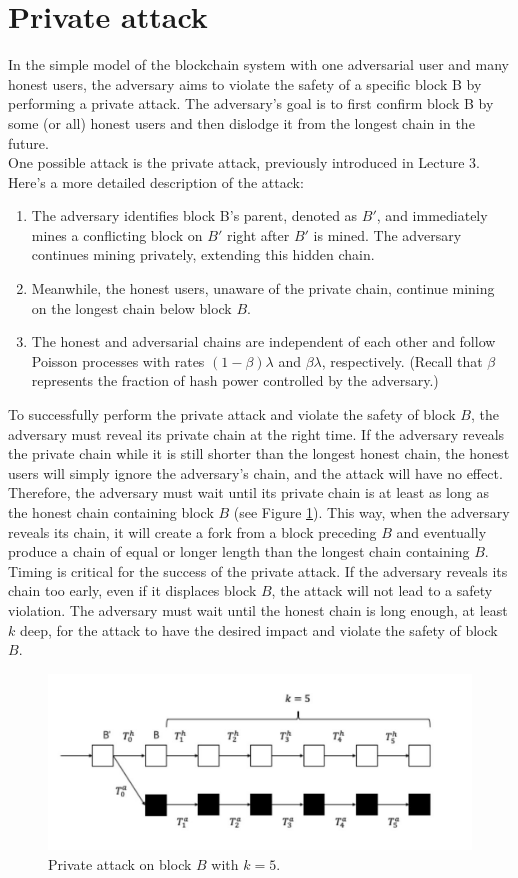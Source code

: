 \section{Private attack}
In the simple model of the blockchain system with one adversarial user and many honest users, the adversary aims to violate the safety of a specific block B by performing a private attack. The adversary's goal is to first confirm block B by some (or all) honest users and then dislodge it from the longest chain in the future.\\
One possible attack is the private attack, previously introduced in Lecture 3. Here's a more detailed description of the attack:
\begin{enumerate}
    \item The adversary identifies block B's parent, denoted as $B′$, and immediately mines a conflicting block on $B′$ right after $B′$ is mined. The adversary continues mining privately, extending this hidden chain. 
    \item Meanwhile, the honest users, unaware of the private chain, continue mining on the longest chain below block $B$.
    \item The honest and adversarial chains are independent of each other and follow Poisson processes with rates $(1 − \beta)\lambda$ and $\beta\lambda$, respectively. (Recall that $\beta$ represents the fraction of hash power controlled by the adversary.)
\end{enumerate}
To successfully perform the private attack and violate the safety of block $B$, the adversary must reveal its private chain at the right time. If the adversary reveals the private chain while it is still shorter than the longest honest chain, the honest users will simply ignore the adversary's chain, and the attack will have no effect.\\
Therefore, the adversary must wait until its private chain is at least as long as the honest chain containing block $B$ (see Figure \ref{fig:f1}). This way, when the adversary reveals its chain, it will create a fork from a block preceding $B$ and eventually produce a chain of equal or longer length than the longest chain containing $B$.\\
Timing is critical for the success of the private attack. If the adversary reveals its chain too early, even if it displaces block $B$, the attack will not lead to a safety violation. The adversary must wait until the honest chain is long enough, at least $k$ deep, for the attack to have the desired impact and violate the safety of block $B$. 
\begin{figure}[h!]
    \centering
    \includegraphics[width=0.6\linewidth]{Fig/06/F1}
    \caption{Private attack on block $B$ with $k = 5$.}
    \label{fig:f1}
\end{figure}
